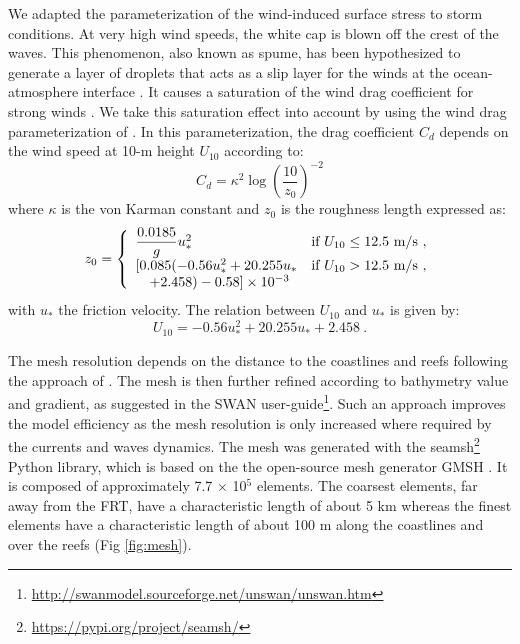 We adapted the parameterization of the wind-induced surface stress to storm conditions. At very high wind speeds, the white cap is blown off the crest of the waves. This phenomenon, also known as spume, has been hypothesized to generate a layer of droplets that acts as a slip layer for the winds at the ocean-atmosphere interface \citep{holthuijsen2012wind}. It causes a saturation of the wind drag coefficient for strong winds \citep{powell2003reduced,donelan2004limiting,curcic2020revised}. We take this saturation effect into account by using the wind  drag parameterization of \cite{moon2007physics}. In this parameterization, the drag coefficient $C_d$ depends on the wind speed at 10-m height $U_{10}$ according to:
\begin{equation}
    C_d = \kappa^2 \log\left(\dfrac{10}{z_0}\right)^{-2}\label{eq:drag}
\end{equation}
where $\kappa$ is the von Karman constant and $z_0$ is the roughness length expressed as: 
\begin{equation}
    z_0 =\left\{\begin{array}[]{ll}
        \dfrac{0.0185}{g}u_{\ast}^2 & \text{if }U_{10} \leq 12.5\text{ m/s}~, \\
        \lbrack 0.085(-0.56u_{\ast}^2+20.255u_{\ast} & \text{if }U_{10} > 12.5\text{ m/s}~, \\
        \quad +2.458) - 0.58\rbrack\times 10^{-3} 
    \end{array}\right.
\end{equation}
with $u_\ast$ the friction velocity. The relation between $U_{10}$ and $u_{\ast}$ is given by:
\begin{equation}
    U_{10}=-0.56u_{\ast}^2+20.255u_{\ast}+2.458~.
\end{equation}

The mesh resolution depends on the distance to the coastlines and reefs following the approach of \cite{dobbelaere2020coupled}. The mesh is then further refined according to bathymetry value and gradient, as suggested in the SWAN user-guide\footnote{\url{http://swanmodel.sourceforge.net/unswan/unswan.htm}}. Such an approach improves the model efficiency as the mesh resolution is only increased where required by the currents and waves dynamics. The mesh was generated with the seamsh\footnote{\url{https://pypi.org/project/seamsh/}} Python library, which is based on the the open-source mesh generator GMSH \citep{geuzaine2009gmsh}. It is composed of approximately 7.7 $\times$ 10$^5$ elements. The coarsest elements, far away from the FRT, have a characteristic length of about 5 km whereas the finest elements have a characteristic length of about 100 m along the coastlines and over the reefs (Fig \ref{fig:mesh}).

